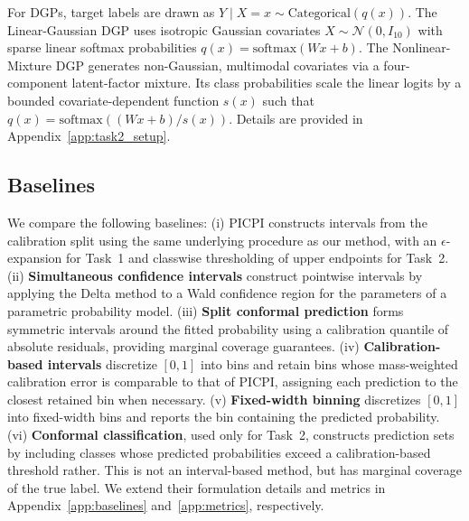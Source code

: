 \documentclass[11pt]{article}
\theoremstyle{statplain}
\theoremstyle{statdefinition}
\newcommand{\0}{\mathbf{0}}
\newcommand{\titleShort}{PICPI\xspace}
\begin{document}


For DGPs, target labels are drawn as $Y \mid X=x \sim \mathrm{Categorical}(q(x))$. The Linear-Gaussian DGP uses isotropic Gaussian covariates $X \sim \mathcal{N}(0, I_{10})$ with sparse linear softmax probabilities $q(x) = \mathrm{softmax}(Wx + b)$. The Nonlinear-Mixture DGP generates non-Gaussian, multimodal covariates via a four-component latent-factor mixture. Its class probabilities scale the linear logits by a bounded covariate-dependent function $s(x)$ such that $q(x) = \mathrm{softmax}\left((Wx + b)/{s(x)}\right)$. Details are provided in Appendix~\ref{app:task2_setup}.


\subsection{Baselines}
We compare the following baselines: (i) \titleShort constructs intervals from the calibration split using the same underlying procedure as our method, with an $\epsilon$-expansion for Task~1 and classwise thresholding of upper endpoints for Task~2. 
(ii) \textbf{Simultaneous confidence intervals} construct pointwise intervals by applying the Delta method to a Wald confidence region for the parameters of a parametric probability model. 
(iii) \textbf{Split conformal prediction} forms symmetric intervals around the fitted probability using a calibration quantile of absolute residuals, providing marginal coverage guarantees. 
(iv) \textbf{Calibration-based intervals} discretize $[0,1]$ into bins and retain bins whose mass-weighted calibration error is comparable to that of \titleShort, assigning each prediction to the closest retained bin when necessary. 
(v) \textbf{Fixed-width binning} discretizes $[0,1]$ into fixed-width bins and reports the bin containing the predicted probability. (vi) \textbf{Conformal classification}, used only for Task~2, constructs prediction sets by including classes whose predicted probabilities exceed a calibration-based threshold rather. This is not an interval-based method, but has marginal coverage of the true label.
We extend their formulation details and metrics in Appendix~\ref{app:baselines} and~\ref{app:metrics}, respectively.
\end{document}
